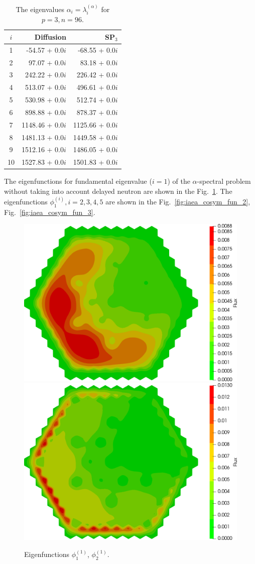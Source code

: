\documentclass[authoryear]{elsarticle}
\begin{document}
\begin{table}[h]
\caption{The eigenvalues $\alpha_i=\lambda_i^{(\alpha)}$ for $p=3, n=96$.}
\label{tab:iaea_cosym_alpha_10}
\begin{center}
\begin{tabular}{crr}
\hline
$i$ & Diffusion & SP$_3$ \\
\hline
1 &-54.57 + 0.0$i$&-68.55 + 0.0$i$ \\
2 &  97.07 + 0.0$i$&83.18 + 0.0$i$ \\
3 &242.22 + 0.0$i$&226.42 + 0.0$i$ \\
4 &513.07 + 0.0$i$&496.61 + 0.0$i$ \\
5 &530.98 + 0.0$i$&512.74 + 0.0$i$ \\
6 &898.88 + 0.0$i$&878.37 + 0.0$i$ \\
7 &1148.46 + 0.0$i$&1125.66 + 0.0$i$ \\
8 &1481.13 + 0.0$i$&1449.58 + 0.0$i$ \\
9 &1512.16 + 0.0$i$&1486.05 + 0.0$i$ \\
10&1527.83 + 0.0$i$&1501.83 + 0.0$i$ \\
\hline
\end{tabular}
\end{center}
\end{table}

The eigenfunctions for fundamental eigenvalue ($i=1$) of the $\alpha$-spectral problem without taking into account delayed neutron are shown in the Fig.~\ref{fig:iaea_cosym_fun_1}. 
The eigenfunctions $\phi_1^{(i)}, i=2,3,4,5$ are shown in the Fig.~\ref{fig:iaea_cosym_fun_2}, Fig.~\ref{fig:iaea_cosym_fun_3}.

\begin{figure}[h]
\begin{center}
	\includegraphics[width=0.49\linewidth]{iaea_cosym/sp3_alpha_u1_1_assym.png}
	\includegraphics[width=0.49\linewidth]{iaea_cosym/sp3_alpha_u2_1_assym.png}\\
	\caption{Eigenfunctions $\phi_1^{(1)}$, $\phi_2^{(1)}$.}
	\label{fig:iaea_cosym_fun_1}
\end{center}
\end{figure}
\end{document}
